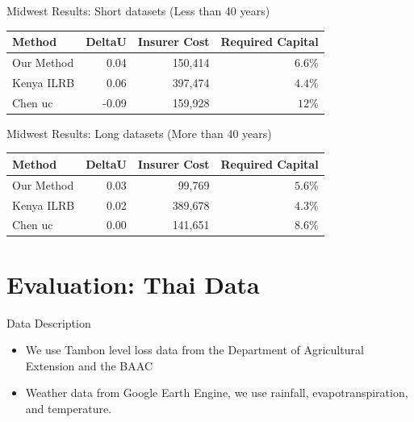 \documentclass{beamer}
\begin{document}
\begin{frame}{Midwest Results: Short datasets (Less than 40 years)}
    \begin{table}
        \begin{tabular}{lrrr}
            \toprule
                  Method &  DeltaU &  Insurer Cost &  Required Capital \\
            \midrule
            Our Method &   0.04 &     150,414 &           $6.6\%$ \\
               Kenya ILRB &   0.06 &     397,474 &          $4.4\%$ \\
                 Chen uc &    -0.09 &     159,928 &          $12\%$ \\
            \bottomrule
            \end{tabular}
    \end{table}
\end{frame}

\begin{frame}{Midwest Results: Long datasets (More than 40 years)}
    \begin{table}
        \begin{tabular}{lrrr}
            \toprule
                  Method &  DeltaU &  Insurer Cost &  Required Capital \\
            \midrule
            Our Method &   0.03 &      99,769 &           $5.6\%$ \\
               Kenya ILRB &   0.02 &     389,678 &          $4.3\%$ \\
                 Chen uc &   0.00 &     141,651 &          $8.6\%$ \\
            \bottomrule
            \end{tabular}
    \end{table}
\end{frame}

\section{Evaluation: Thai Data}
\begin{frame}{Data Description}
    \begin{itemize}
        \setlength\itemsep{2em}
        \item We use Tambon level loss data from the Department of Agricultural Extension and the BAAC 
        \item Weather data from Google Earth Engine, we use rainfall, evapotranspiration, and temperature. 
    \end{itemize}
\end{frame}
\end{document}
